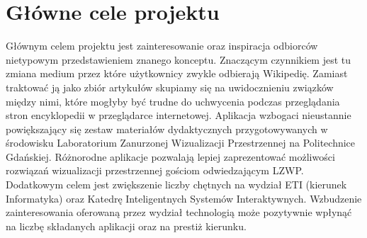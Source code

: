 \section{Główne cele projektu}
Głównym celem projektu jest zainteresowanie oraz inspiracja odbiorców nietypowym przedstawieniem znanego konceptu. Znaczącym czynnikiem jest tu zmiana medium przez które użytkownicy zwykle odbierają Wikipedię. Zamiast traktować ją jako zbiór artykułów skupiamy się na uwidocznieniu związków między nimi, które mogłyby być trudne do uchwycenia podczas przeglądania stron encyklopedii w przeglądarce internetowej.
Aplikacja wzbogaci nieustannie powiększający się zestaw materiałów dydaktycznych przygotowywanych w środowisku Laboratorium Zanurzonej Wizualizacji Przestrzennej na Politechnice Gdańskiej. Różnorodne aplikacje pozwalają lepiej zaprezentować możliwości rozwiązań wizualizacji przestrzennej gościom odwiedzającym LZWP.
Dodatkowym celem jest zwiększenie liczby chętnych na wydział ETI (kierunek Informatyka) oraz Katedrę Inteligentnych Systemów Interaktywnych. Wzbudzenie zainteresowania oferowaną przez wydział technologią może pozytywnie wpłynąć na liczbę składanych aplikacji oraz na prestiż kierunku.
